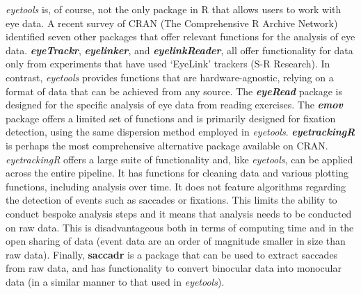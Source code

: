\documentclass[
  man,
  floatsintext,
  longtable,
  nolmodern,
  notxfonts,
  notimes,
  colorlinks=true,linkcolor=blue,citecolor=blue,urlcolor=blue]{apa7}
\begin{document}
\emph{eyetools} is, of course, not the only package in R that allows
users to work with eye data. A recent survey of CRAN (The Comprehensive
R Archive Network) identified seven other packages that offer relevant
functions for the analysis of eye data. \textbf{\emph{eyeTrackr}},
\textbf{\emph{eyelinker}}, and \textbf{\emph{eyelinkReader}}, all offer
functionality for data only from experiments that have used `EyeLink'
trackers (S-R Research). In contrast, \emph{eyetools} provides functions
that are hardware-agnostic, relying on a format of data that can be
achieved from any source. The \textbf{\emph{eyeRead}} package is
designed for the specific analysis of eye data from reading exercises.
The \textbf{\emph{emov}} package offers a limited set of functions and
is primarily designed for fixation detection, using the same dispersion
method employed in \emph{eyetools}. \textbf{\emph{eyetrackingR}} is
perhaps the most comprehensive alternative package available on CRAN.
\emph{eyetrackingR} offers a large suite of functionality and, like
\emph{eyetools}, can be applied across the entire pipeline. It has
functions for cleaning data and various plotting functions, including
analysis over time. It does not feature algorithms regarding the
detection of events such as saccades or fixations. This limits the
ability to conduct bespoke analysis steps and it means that analysis
needs to be conducted on raw data. This is disadvantageous both in terms
of computing time and in the open sharing of data (event data are an
order of magnitude smaller in size than raw data). Finally,
\textbf{saccadr} is a package that can be used to extract saccades from
raw data, and has functionality to convert binocular data into monocular
data (in a similar manner to that used in \emph{eyetools}).
\end{document}
